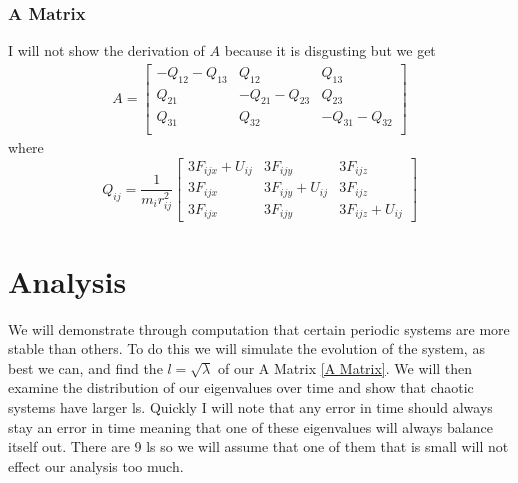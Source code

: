 \subsection{A Matrix}
I will not show the derivation of $A$ because it is disgusting but we get
\begin{align}
A = \left[\begin{array}{ccc}
-Q_{12}-Q_{13} & Q_{12} & Q_{13}\\
Q_{21} & -Q_{21}-Q_{23} & Q_{23}\\
Q_{31} & Q_{32} & -Q_{31}-Q_{32}\\
\end{array}\right]\label{A Matrix}
\end{align}
where \[Q_{ij}=\frac{1}{m_ir_{ij}^2}\left[\begin{array}{ccc}
3F_{ijx}+U_{ij} & 3F_{ijy} & 3F_{ijz}\\
3F_{ijx} & 3F_{ijy}+U_{ij} & 3F_{ijz}\\
3F_{ijx} & 3F_{ijy} & 3F_{ijz}+U_{ij}
\end{array}\right]\]


\chapter{Analysis}
We will demonstrate through computation that certain periodic systems are more stable than others. To do this we will simulate the evolution of the system, as best we can, and find the $l = \sqrt{\lambda}$ of our A Matrix \ref{A Matrix}. We will then examine the distribution of our eigenvalues over time and show that chaotic systems have larger ls. Quickly I will note that any error in time should always stay an error in time meaning that one of these eigenvalues will always balance itself out. There are 9 ls so we will assume that one of them that is small will not effect our analysis too much.\\

